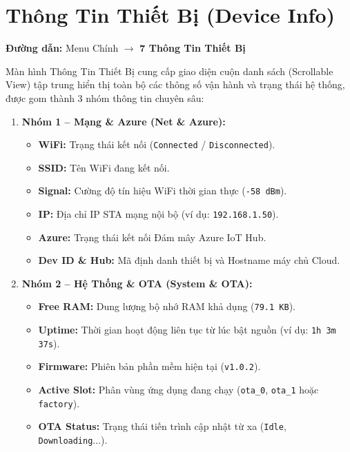 \documentclass[12pt,a4paper]{article}
\begin{document}

\section{Thông Tin Thiết Bị (Device Info)}
\label{sec:device_info}

\textbf{Đường dẫn:} Menu Chính $\rightarrow$ \textbf{7 Thông Tin Thiết Bị}

Màn hình Thông Tin Thiết Bị cung cấp giao diện cuộn danh sách (Scrollable View) tập trung hiển thị toàn bộ các thông số vận hành và trạng thái hệ thống, được gom thành 3 nhóm thông tin chuyên sâu:

\begin{enumerate}
    \item \textbf{Nhóm 1 -- Mạng \& Azure (Net \& Azure):}
    \begin{itemize}[label={-}]
        \item \textbf{WiFi:} Trạng thái kết nối (\texttt{Connected} / \texttt{Disconnected}).
        \item \textbf{SSID:} Tên WiFi đang kết nối.
        \item \textbf{Signal:} Cường độ tín hiệu WiFi thời gian thực (\texttt{-58 dBm}).
        \item \textbf{IP:} Địa chỉ IP STA mạng nội bộ (ví dụ: \texttt{192.168.1.50}).
        \item \textbf{Azure:} Trạng thái kết nối Đám mây Azure IoT Hub.
        \item \textbf{Dev ID \& Hub:} Mã định danh thiết bị và Hostname máy chủ Cloud.
    \end{itemize}
    \item \textbf{Nhóm 2 -- Hệ Thống \& OTA (System \& OTA):}
    \begin{itemize}[label={-}]
        \item \textbf{Free RAM:} Dung lượng bộ nhớ RAM khả dụng (\texttt{79.1 KB}).
        \item \textbf{Uptime:} Thời gian hoạt động liên tục từ lúc bật nguồn (ví dụ: \texttt{1h 3m 37s}).
        \item \textbf{Firmware:} Phiên bản phần mềm hiện tại (\texttt{v1.0.2}).
        \item \textbf{Active Slot:} Phân vùng ứng dụng đang chạy (\texttt{ota\_0}, \texttt{ota\_1} hoặc \texttt{factory}).
        \item \textbf{OTA Status:} Trạng thái tiến trình cập nhật từ xa (\texttt{Idle}, \texttt{Downloading}...).
    \end{itemize}

\end{enumerate}
\end{document}
